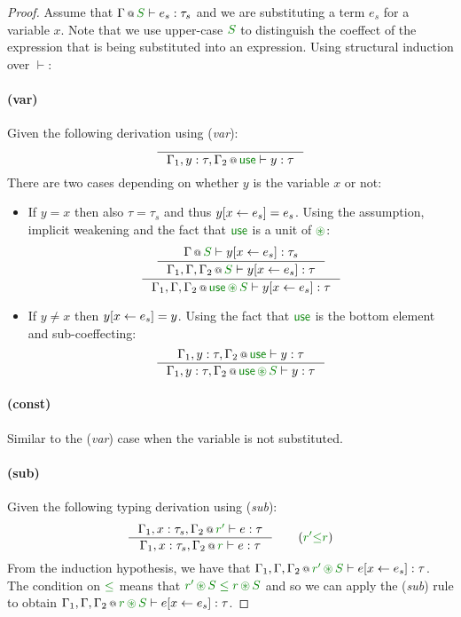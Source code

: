 \begin{proof}
Assume that $\coctx{\Gamma}{\cclrd{S}} \vdash e_s : \tau_s$ and we are substituting a term $e_s$ for 
a variable $x$. Note that we use upper-case $\cclrd{S}$ to distinguish the coeffect of the expression
that is being substituted into an expression. Using structural induction over $\vdash$:

\paragraph{(var)} Given the following derivation using (\emph{var}):
\[
\inference
  { }
  {\coctx{\Gamma_1, y:\tau, \Gamma_2}{\cunit} \vdash y : \tau }
\]
There are two cases depending on whether $y$ is the variable $x$ or not:
\begin{itemize}
\item If $y=x$ then also $\tau = \tau_s$ and thus $y[x \leftarrow e_s] = e_s$. Using the assumption,
implicit weakening and the fact that $\cunit$ is a unit of $\cseq$:
\[
\inference
 {\inference 
  {\coctx{\Gamma}{\cclrd{S}} \vdash \subst{y}{x}{e_s} : \tau_s }
  {\coctx{\Gamma_1, \Gamma, \Gamma_2}{\cclrd{S}} \vdash \subst{y}{x}{e_s} : \tau } }
 {\coctx{\Gamma_1, \Gamma, \Gamma_2}{\cunit\,\cseq\,\cclrd{S}} \vdash \subst{y}{x}{e_s} : \tau } 
\]
\item If $y\neq x$ then $y[x \leftarrow e_s] = y$. Using the fact that $\cunit$ is the bottom element
and sub-coeffecting:
\[
\inference
  {\coctx{\Gamma_1, y:\tau, \Gamma_2}{\cunit} \vdash y : \tau }
  {\coctx{\Gamma_1, y:\tau, \Gamma_2}{\cunit\,\cseq\,\cclrd{S}} \vdash y : \tau }
\]
\end{itemize}

\paragraph{(const)} Similar to the (\emph{var}) case when the variable is not substituted.

\paragraph{(sub)} Given the following typing derivation using (\emph{sub}):
\[
\inference
  {\coctx{\Gamma_1,x:\tau_s,\Gamma_2}{\cclrd{r'}} \vdash e : \tau }
  {\coctx{\Gamma_1,x:\tau_s,\Gamma_2}{\cclrd{r}} \vdash e : \tau }\quad\quad(\cclrd{r'} \cleq \cclrd{r})
\]
From the induction hypothesis, we have that
$\coctx{\Gamma_1,\Gamma,\Gamma_2}{\cclrd{r'}\,\cseq\,\cclrd{S}} \vdash \subst{e}{x}{e_s} : \tau$.
The condition on $\cleq$ means that $\cclrd{r'}\,\cseq\,\cclrd{S}\;\cleq\;\cclrd{r}\,\cseq\,\cclrd{S}$
and so we can apply the (\emph{sub}) rule to obtain
$\coctx{\Gamma_1,\Gamma,\Gamma_2}{\cclrd{r}\,\cseq\,\cclrd{S}} \vdash \subst{e}{x}{e_s} : \tau$.


\end{proof}
